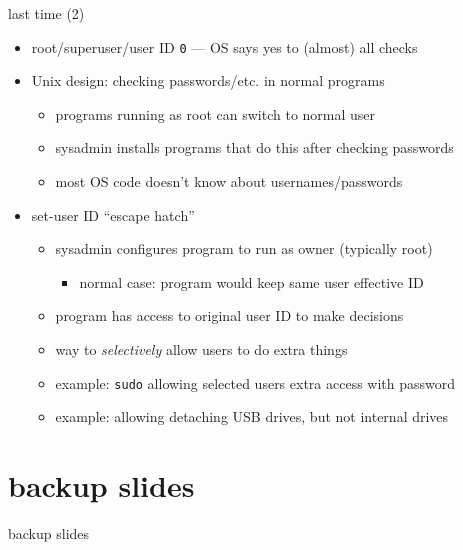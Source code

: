 \begin{frame}{last time (2)}
    \begin{itemize}
    \item root/superuser/user ID \texttt{0} --- OS says yes to (almost) all checks
    \item Unix design: checking passwords/etc. in normal programs
        \begin{itemize}
        \item programs running as root can switch to normal user
        \item sysadmin installs programs that do this after checking passwords
        \item most OS code doesn't know about usernames/passwords
        \end{itemize}
    \item set-user ID ``escape hatch''
        \begin{itemize}
        \item sysadmin configures program to run as owner (typically root)
            \begin{itemize}
            \item normal case: program would keep same user effective ID
            \end{itemize}
        \item program has access to original user ID to make decisions
        \item way to \textit{selectively} allow users to do extra things
        \item example: \texttt{sudo} allowing selected users extra access with password
        \item example: allowing detaching USB drives, but not internal drives
        \end{itemize}
    \end{itemize}
\end{frame}







\section{backup slides}
\begin{frame}{backup slides}
\end{frame}


